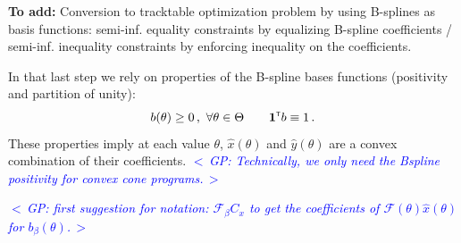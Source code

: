 \documentclass{article}
\renewcommand{\t}{^{\mbox{\tiny \sf T}}}    %
\newcommand{\ppar}{\theta}                  %
\newcommand{\Ppar}{\Theta}                  %
\newcommand{\calF}{\mathcal{F}}
\newcommand{\commentGP}[1]{\noindent \textcolor{blue}{\emph{$<\,$GP: #1$\,>$}}}%
\begin{document}
\vspace*{12pt}
\noindent\textbf{To add:} Conversion to tracktable optimization problem by using B-splines as basis functions: semi-inf. equality constraints by equalizing B-spline coefficients / semi-inf. inequality constraints by enforcing inequality on the coefficients.

In that last step we rely on properties of the B-spline bases functions (positivity and partition of unity):
\[ b(\ppar)\geq0\,,~\forall\ppar\in\Ppar \qquad \mathbf{1}\t b \equiv 1\,.%
\]
These properties imply at each value $\ppar$, $\hat{x}(\ppar)$ and $\hat{y}(\ppar)$ are a convex combination of their coefficients. \commentGP{Technically, we only need the Bspline positivity for convex cone programs.}

\commentGP{first suggestion for notation: $\calF_\beta C_x$ to get the coefficients of $\calF(\ppar)\hat{x}(\ppar)$ for $b_\beta(\ppar)$.}
\end{document}
